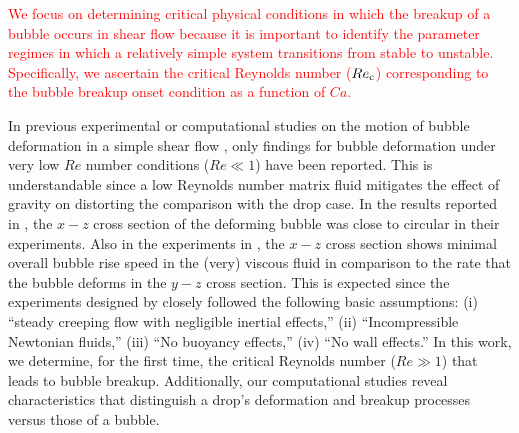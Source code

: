\documentclass{elsarticle}
\begin{document}
\par
\textcolor{red} {
We focus on determining critical physical conditions in which the breakup of a bubble occurs in shear flow because it is important to identify the parameter regimes in which a relatively simple system transitions from stable to unstable.  Specifically, we ascertain the critical Reynolds number ($Re_{\rm c}$) corresponding to the bubble breakup onset condition as a function of $Ca$.  
}
\par
In previous experimental or computational studies on the motion of bubble deformation in a simple shear flow \cite{CanedoETAL,RusMan02, MulTobDreFisWin08}, only findings for bubble deformation under very low $Re$ number conditions ($Re \ll 1$) have been reported.  This is understandable since a low Reynolds number matrix fluid mitigates the effect of gravity on distorting the comparison with the drop case.  In the results reported in \cite{CanedoETAL}, the $x-z$ cross section of the deforming bubble was close to circular in their experiments.  Also in the experiments in \cite{CanedoETAL}, the $x-z$ cross section shows minimal overall bubble rise speed in the (very) viscous fluid in comparison to the rate that the bubble deforms in the $y-z$ cross section.  This is expected since the experiments designed by \cite{CanedoETAL} closely followed the following basic assumptions: (i) ``steady creeping flow with negligible inertial effects,'' (ii) ``Incompressible Newtonian fluids,'' (iii) ``No buoyancy effects,'' (iv) ``No wall effects.''  In this work, we determine, for the first time, the critical Reynolds number ($Re \gg 1$) that leads to bubble breakup.  Additionally, our computational studies reveal characteristics that distinguish a drop's deformation and breakup processes versus those of a bubble.
\par
\end{document}
